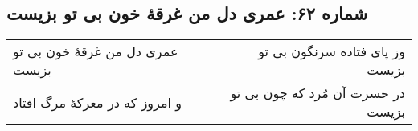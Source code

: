 \begin{center}
\section*{شماره ۶۲: عمری دل من غرقۀ خون بی تو بزیست}
\label{sec:062}
\begin{longtable}{l p{0.5cm} r}
عمری دل من غرقهٔ خون بی تو بزیست
&&
وز پای فتاده سرنگون بی تو بزیست
\\
و امروز که در معرکهٔ مرگ افتاد
&&
در حسرت آن مُرد که چون بی تو بزیست
\\
\end{longtable}
\end{center}
